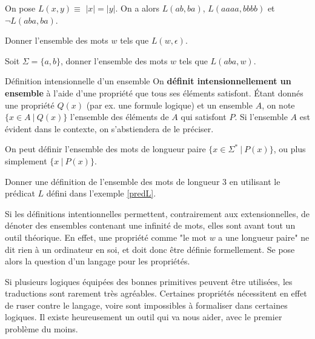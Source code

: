 \begin{example}
\label{predL}
On pose $L(x,y) \equiv$ $|x| = |y|$. On a alors $L(ab,ba)$, $L(aaaa,bbbb)$ et $\neg L(aba,ba)$.
\end{example}

\begin{exercice}
Donner l'ensemble des mots $w$ tels que $L(w,\epsilon)$. 
\end{exercice}

\begin{exercice}
Soit $\Sigma = \{a,b\}$, donner l'ensemble des mots $w$ tels que $L(aba,w)$. 
\end{exercice}

\begin{definition}{Définition intensionnelle d'un ensemble}{}
On \textbf{définit intensionnellement un ensemble} à l'aide d'une propriété que tous ses éléments satisfont. Étant donnés une propriété $Q(x)$ (par ex. une formule logique) et un ensemble $A$, on note $\{x \in A~|~Q(x)\}$ l'ensemble des éléments de $A$ qui satisfont $P$. Si l'ensemble $A$ est évident dans le contexte, on s'abstiendera de le préciser.
\end{definition}

\begin{example}
On peut définir l'ensemble des mots de longueur paire $\{x \in \Sigma^*~|~P(x)\}$, ou plus simplement $\{x ~|~P(x)\}$.
\end{example}

\begin{exercice}
Donner une définition de l'ensemble des mots de longueur 3 en utilisant le prédicat $L$ défini dans l'exemple \ref{predL}. 
\end{exercice}

Si les définitions intentionnelles permettent, contrairement aux extensionnelles, de dénoter des ensembles contenant une infinité de mots, elles sont avant tout un outil théorique. En effet, une propriété comme "le mot $w$ a une longueur paire" ne dit rien à un ordinateur en soi, et doit donc être définie formellement. Se pose alors la question d'un langage pour les propriétés.

Si plusieurs logiques équipées des bonnes primitives peuvent être utilisées, les traductions sont rarement très agréables. Certaines propriétés nécessitent en effet de ruser contre le langage, voire sont impossibles à formaliser dans certaines logiques. Il existe heureusement un outil qui va nous aider, avec le premier problème du moins.


